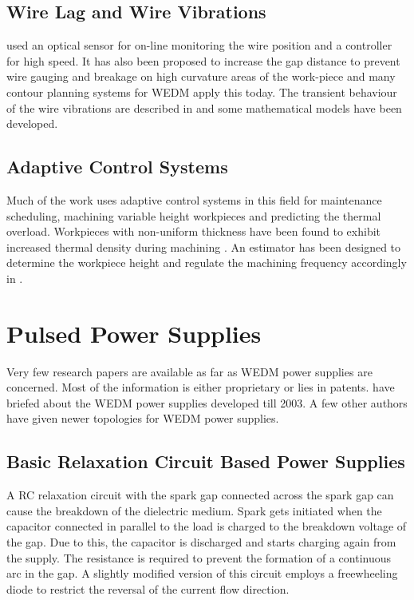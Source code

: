 \subsection{Wire Lag and Wire Vibrations}
	\citet{dauw1994high} used an optical sensor for on-line monitoring the wire position and a controller for high speed. It has also been proposed to increase the gap distance to prevent wire gauging and breakage on high curvature areas of the work-piece \cite{wang2003computer} and many contour planning systems for WEDM apply this today. The transient behaviour of the wire vibrations are described in \cite{mohri1998system} and some mathematical models have been developed.

\subsection{Adaptive Control Systems}
	Much of the work uses adaptive control systems in this field for maintenance scheduling, machining variable height workpieces and predicting the thermal overload. Workpieces with non-uniform thickness have been found to exhibit increased thermal density during machining \cite{kinoshita1982control}. An estimator has been designed to determine the workpiece height and regulate the machining frequency accordingly in \citet{rajurkar1997wedm}.
	
\section{Pulsed Power Supplies}
	Very few research papers are available as far as WEDM power supplies are concerned. Most of the information is either proprietary or lies in patents. \citet{sen2003developments} have briefed about the WEDM power supplies developed till 2003. A few other authors have given newer topologies for WEDM power supplies.
\subsection{Basic Relaxation Circuit Based Power Supplies}
	A RC relaxation circuit with the spark gap connected across the spark gap can cause the breakdown of the dielectric medium. Spark gets initiated when the capacitor connected in parallel to the load is charged to the breakdown voltage of the gap. Due to this, the capacitor is discharged and starts charging again from the supply. The resistance is required to prevent the formation of a continuous arc in the gap. A slightly modified version of this circuit employs a freewheeling diode to restrict the reversal of the current flow direction.

